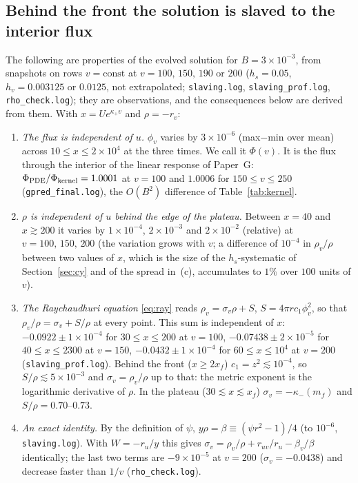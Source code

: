 \documentclass[11pt]{article}
\begin{document}
\subsection{Behind the front the solution is slaved to the interior flux}
\label{sec:slave}

The following are properties of the evolved solution for $B=3\times10^{-3}$, from snapshots on rows $v=\mathrm{const}$ at $v=100,\,150,\,190$ or $200$ ($h_s=0.05$, $h_v=0.003125$ or $0.0125$, not extrapolated; \texttt{slaving.log}, \texttt{slaving\_prof.log}, \texttt{rho\_check.log}); they are observations, and the consequences below are derived from them. With $x=Ue^{\kappa_+v}$ and $\rho=-r_v$:
\begin{enumerate}
\item[(a)] \emph{The flux is independent of $u$.} $\phi_v$ varies by $3\times10^{-6}$ (max$-$min over mean) across $10\le x\le2\times10^{4}$ at the three times. We call it $\Phi(v)$. It is the flux through the interior of the linear response of Paper~G: $\Phi_{\rm PDE}/\Phi_{\rm kernel}=1.0001$ at $v=100$ and $1.0006$ for $150\le v\le250$ (\texttt{gpred\_final.log}), the $O(B^{2})$ difference of Table~\ref{tab:kernel}.
\item[(b)] \emph{$\rho$ is independent of $u$ behind the edge of the plateau.} Between $x=40$ and $x\gtrsim200$ it varies by $1\times10^{-4}$, $2\times10^{-3}$ and $2\times10^{-2}$ (relative) at $v=100,\,150,\,200$ (the variation grows with $v$; a difference of $10^{-4}$ in $\rho_v/\rho$ between two values of $x$, which is the size of the $h_s$-systematic of Section~\ref{sec:cy} and of the spread in~(c), accumulates to $1\%$ over $100$ units of $v$).
\item[(c)] \emph{The Raychaudhuri equation} \eqref{eq:ray} reads $\rho_v=\sigma_v\rho+S$, $S=4\pi rc_1\phi_v^{2}$, so that $\rho_v/\rho=\sigma_v+S/\rho$ at every point. This sum is independent of $x$: $-0.0922\pm1\times10^{-4}$ for $30\le x\le200$ at $v=100$, $-0.07438\pm2\times10^{-5}$ for $40\le x\le2300$ at $v=150$, $-0.0432\pm1\times10^{-4}$ for $60\le x\le10^{4}$ at $v=200$ (\texttt{slaving\_prof.log}). Behind the front ($x\ge2x_f$) $c_1=z^{2}\lesssim10^{-4}$, so $S/\rho\lesssim5\times10^{-3}$ and $\sigma_v=\rho_v/\rho$ up to that: the metric exponent is the logarithmic derivative of $\rho$. In the plateau ($30\lesssim x\lesssim x_f$) $\sigma_v=-\kappa_-(m_f)$ and $S/\rho=0.70$--$0.73$.
\item[(d)] \emph{An exact identity.} By the definition of $\psi$, $y\rho=\beta\equiv(\psi r^{2}-1)/4$ (to $10^{-6}$, \texttt{slaving.log}). With $W=-r_u/y$ this gives $\sigma_v=\rho_v/\rho+r_{uv}/r_u-\beta_v/\beta$ identically; the last two terms are $-9\times10^{-5}$ at $v=200$ ($\sigma_v=-0.0438$) and decrease faster than $1/v$ (\texttt{rho\_check.log}).
\end{enumerate}
\end{document}
